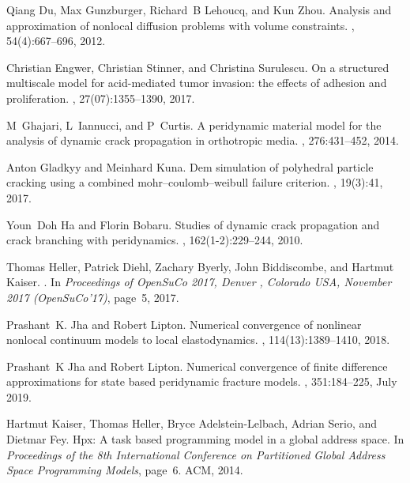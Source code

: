 \documentclass[11pt,twocolumn]{amsart}
\theoremstyle{definition}
\theoremstyle{definition}
\numberwithin{equation}{section}
\numberwithin{equation}{section}
\begin{document}
\begin{thebibliography}{10}
	Qiang Du, Max Gunzburger, Richard~B Lehoucq, and Kun Zhou.
	\newblock Analysis and approximation of nonlocal diffusion problems with volume
	constraints.
	, 54(4):667--696, 2012.
	
	Christian Engwer, Christian Stinner, and Christina Surulescu.
	\newblock On a structured multiscale model for acid-mediated tumor invasion:
	the effects of adhesion and proliferation.
	,
	27(07):1355--1390, 2017.
	
	M~Ghajari, L~Iannucci, and P~Curtis.
	\newblock A peridynamic material model for the analysis of dynamic crack
	propagation in orthotropic media.
	,
	276:431--452, 2014.
	
	Anton Gladkyy and Meinhard Kuna.
	\newblock Dem simulation of polyhedral particle cracking using a combined
	mohr--coulomb--weibull failure criterion.
	, 19(3):41, 2017.
	
	Youn~Doh Ha and Florin Bobaru.
	\newblock Studies of dynamic crack propagation and crack branching with
	peridynamics.
	, 162(1-2):229--244, 2010.
	
	Thomas Heller, Patrick Diehl, Zachary Byerly, John Biddiscombe, and Hartmut
	Kaiser.
	.
	\newblock In {\em {Proceedings of OpenSuCo 2017, Denver , Colorado USA,
			November 2017 (OpenSuCo’17)}}, page~5, 2017.
	
	Prashant~K. Jha and Robert Lipton.
	\newblock Numerical convergence of nonlinear nonlocal continuum models to local
	elastodynamics.
	,
	114(13):1389--1410, 2018.
	
	Prashant~K Jha and Robert Lipton.
	\newblock Numerical convergence of finite difference approximations for state
	based peridynamic fracture models.
	,
	351:184--225, July 2019.
	
	Hartmut Kaiser, Thomas Heller, Bryce Adelstein-Lelbach, Adrian Serio, and
	Dietmar Fey.
	\newblock Hpx: A task based programming model in a global address space.
	\newblock In {\em Proceedings of the 8th International Conference on
		Partitioned Global Address Space Programming Models}, page~6. ACM, 2014.
	

\end{thebibliography}
\end{document}
